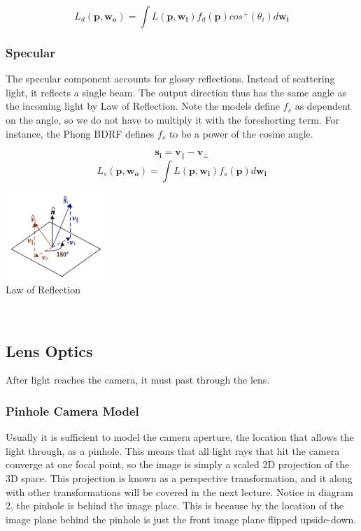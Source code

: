 \documentclass{article}
\let\vec\mathbf
\begin{document}
$$ L_d(\vec{p},\vec{w_o}) = \int L(\vec{p},\vec{w_i})f_d(\vec{p})cos^+(\theta_i)d\vec{w_i}$$ 

\subsubsection{Specular}
The specular component accounts for glossy reflections. Instead of scattering light, it reflects a single beam. The output direction thus has the same angle as the incoming light by Law of Reflection. Note the models define $f_s$ as dependent on the angle, so we do not have to multiply it with the foreshorting term. For instance, the Phong BDRF defines $f_s$ to be a power of the cosine angle. 

$$\vec{s_i} = \vec{v_{\parallel}} - \vec{v_{\perp}}$$
$$L_s(\vec{p}, \vec{w_o}) = \int L(\vec{p},\vec{w_i})f_s(\vec{p})d\vec{w_i}$$

\begin{center}
    \includegraphics[height=1.3in, width=1.5in]{L1F4} \\
    \caption{Law of Reflection}
\end{center}
\\

\subsection{Lens Optics}
After light reaches the camera, it must past through the lens.

\subsubsection{Pinhole Camera Model}
Usually it is sufficient to model the camera aperture, the location that allows the light through, as a pinhole. This means that all light rays that hit the camera converge at one focal point, so the image is simply a scaled 2D projection of the 3D space. This projection is known as a perspective transformation, and it along with other transformations will be covered in the next lecture. Notice in diagram 2, the pinhole is behind the image place. This is because by the location of the image plane behind the pinhole is just the front image plane flipped upside-down. 
\end{document}
